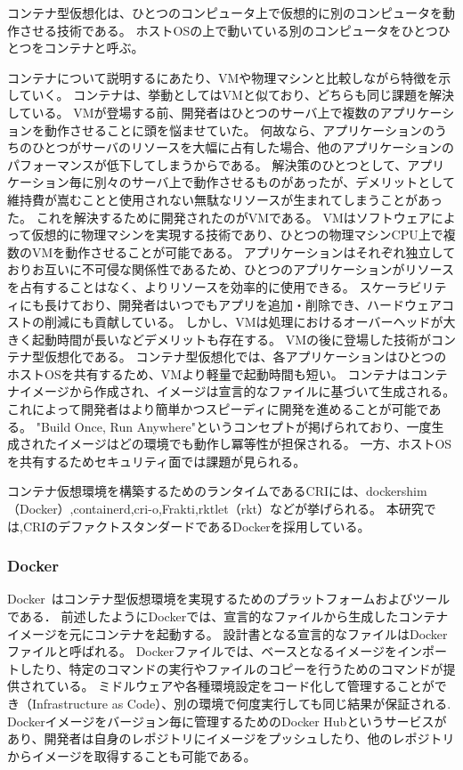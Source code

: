 コンテナ型仮想化は、ひとつのコンピュータ上で仮想的に別のコンピュータを動作させる技術である。
ホストOSの上で動いている別のコンピュータをひとつひとつをコンテナと呼ぶ。

コンテナについて説明するにあたり、VMや物理マシンと比較しながら特徴を示していく。
コンテナは、挙動としてはVMと似ており、どちらも同じ課題を解決している。
VMが登場する前、開発者はひとつのサーバ上で複数のアプリケーションを動作させることに頭を悩ませていた。
何故なら、アプリケーションのうちのひとつがサーバのリソースを大幅に占有した場合、他のアプリケーションのパフォーマンスが低下してしまうからである。
解決策のひとつとして、アプリケーション毎に別々のサーバ上で動作させるものがあったが、デメリットとして維持費が嵩むことと使用されない無駄なリソースが生まれてしまうことがあった。
これを解決するために開発されたのがVMである。
VMはソフトウェアによって仮想的に物理マシンを実現する技術であり、ひとつの物理マシンCPU上で複数のVMを動作させることが可能である。
アプリケーションはそれぞれ独立しておりお互いに不可侵な関係性であるため、ひとつのアプリケーションがリソースを占有することはなく、よりリソースを効率的に使用できる。
スケーラビリティにも長けており、開発者はいつでもアプリを追加・削除でき、ハードウェアコストの削減にも貢献している。
しかし、VMは処理におけるオーバーヘッドが大きく起動時間が長いなどデメリットも存在する。
VMの後に登場した技術がコンテナ型仮想化である。
コンテナ型仮想化では、各アプリケーションはひとつのホストOSを共有するため、VMより軽量で起動時間も短い。
コンテナはコンテナイメージから作成され、イメージは宣言的なファイルに基づいて生成される。
これによって開発者はより簡単かつスピーディに開発を進めることが可能である。
"Build Once, Run Anywhere"というコンセプトが掲げられており、一度生成されたイメージはどの環境でも動作し冪等性が担保される。
一方、ホストOSを共有するためセキュリティ面では課題が見られる。

コンテナ仮想環境を構築するためのランタイムであるCRIには、dockershim（Docker）,containerd,cri-o,Frakti,rktlet（rkt）などが挙げられる。
本研究では,CRIのデファクトスタンダードであるDockerを採用している。

\subsubsection{Docker}
\label{background:container-orchestration-system:container:docker}

Docker~\cite{Docker}はコンテナ型仮想環境を実現するためのプラットフォームおよびツールである．
前述したようにDockerでは、宣言的なファイルから生成したコンテナイメージを元にコンテナを起動する。
設計書となる宣言的なファイルはDockerファイルと呼ばれる。
Dockerファイルでは、ベースとなるイメージをインポートしたり、特定のコマンドの実行やファイルのコピーを行うためのコマンドが提供されている。
ミドルウェアや各種環境設定をコード化して管理することができ（Infrastructure as Code）、別の環境で何度実行しても同じ結果が保証される.
Dockerイメージをバージョン毎に管理するためのDocker Hubというサービスがあり、開発者は自身のレポジトリにイメージをプッシュしたり、他のレポジトリからイメージを取得することも可能である。

